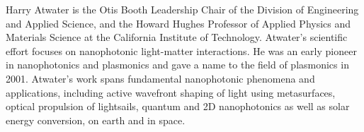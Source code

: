 \documentclass[a4paper,parskip,10pt]{scrartcl}
\begin{document}
\begin{tcolorbox}
        {
            \small
            \color{white!20!black}
            Harry Atwater is the Otis Booth Leadership Chair of the Division of Engineering and Applied Science, and the Howard Hughes Professor of Applied Physics and Materials Science at the California Institute of Technology. Atwater's scientific effort focuses on nanophotonic light-matter interactions. He was an early pioneer in nanophotonics and plasmonics and gave a name to the field of plasmonics in 2001. Atwater's work spans fundamental nanophotonic phenomena and applications, including active wavefront shaping of light using metasurfaces, optical propulsion of lightsails, quantum and 2D nanophotonics as well as solar energy conversion, on earth and in space.}

        \vspace{2ex}
    \end{tcolorbox}

    \vfill
\end{document}
